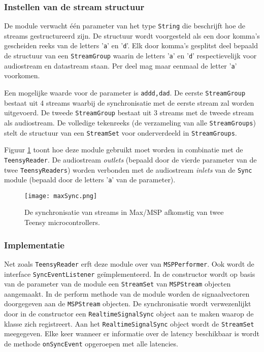 \subsubsection{Instellen van de stream structuur}

De module verwacht één parameter van het type \texttt{String} die beschrijft hoe de streams gestructureerd zijn. De structuur wordt voorgesteld als een door komma's gescheiden reeks van de letters '\texttt{a}' en '\texttt{d}'. Elk door komma's gesplitst deel bepaald de structuur van een \texttt{StreamGroup} waarin de letters '\texttt{a}' en '\texttt{d}' respectievelijk voor audiostream en datastream staan. Per deel mag maar eenmaal de letter '\texttt{a}' voorkomen.

Een mogelijke waarde voor de parameter is \texttt{addd,dad}. De eerste \texttt{StreamGroup} bestaat uit 4 streams waarbij de synchronisatie met de eerste stream zal worden uitgevoerd. De tweede \texttt{StreamGroup} bestaat uit 3 streams met de tweede stream als audiostream. De volledige tekenreeks  (de verzameling van alle \texttt{StreamGroups}) stelt de structuur van een \texttt{StreamSet} voor onderverdeeld in \texttt{StreamGroups}.

Figuur \ref{maxStreamSync} toont hoe deze module gebruikt moet worden in combinatie met de \texttt{TeensyReader}. De audiostream \textit{outlets} (bepaald door de vierde parameter van de twee \texttt{TeensyReaders}) worden verbonden met de audiostream \textit{inlets} van de \texttt{Sync} module (bepaald door de letters '\texttt{a}' van de parameter).

\begin{figure}[h!]
	\captionsetup{width=0.8\textwidth}
	\caption[Synchronisatie in Max/MSP]{De synchronisatie van streams in Max/MSP afkomstig van twee Teensy microcontrollers.}
	\begin{center}
		\advance\parskip0.3cm
		\texttt{[image: maxSync.png]}
	\end{center}
	\label{maxStreamSync}
\end{figure}

\subsubsection{Implementatie}

Net zoals \texttt{TeensyReader} erft deze module over van \texttt{MSPPerformer}. Ook wordt de interface \texttt{SyncEventListener} geïmplementeerd. In de constructor wordt op basis van de parameter van de module een \texttt{StreamSet} van \texttt{MSPStream} objecten aangemaakt. In de perform methode van de module worden de signaalvectoren doorgegeven aan de \texttt{MSPStream} objecten. De synchronisatie wordt verwezenlijkt door in de constructor een \texttt{RealtimeSignalSync} object aan te maken waarop de klasse zich registreert. Aan het \texttt{RealtimeSignalSync} object wordt de \texttt{StreamSet} meegegeven. Elke keer wanneer er informatie over de latency beschikbaar is wordt de methode \texttt{onSyncEvent} opgeroepen met alle latencies.

